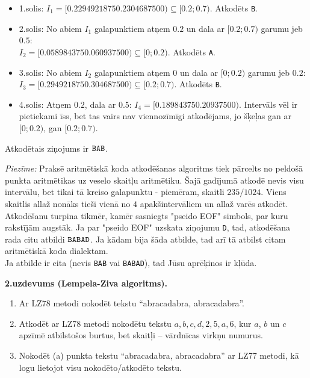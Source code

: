 \documentclass[a4paper,12pt]{article}
\begin{document}
{\begin{itemize}
\item 1.solis: $I_1 = [0.2294921875 0.2304687500) \subseteq [0.2;0.7)$. Atkodēts {\tt B}.
\item 2.solis: No abiem $I_1$ galapunktiem atņem $0.2$ un dala ar $[0.2;0.7)$ garumu jeb $0.5$:\\
$I_2 = [0.058984375 0.060937500) \subseteq [0;0.2)$. Atkodēts {\tt A}.
\item 3.solis: No abiem $I_2$ galapunktiem atņem $0$ un dala ar $[0;0.2)$ garumu jeb $0.2$:\\
$I_3 = [0.294921875 0.304687500) \subseteq [0.2;0.7)$. Atkodēts {\tt B}.
\item 4.solis: Atņem $0.2$, dala ar $0.5$: $I_4 = [0.18984375 0.20937500)$. Intervāls vēl ir pietiekami 
īss, bet tas vairs nav viennozīmīgi atkodējams, jo šķeļas gan ar $[0;0.2)$, gan $[0.2;0.7)$. 
\end{itemize}

Atkodētais ziņojums ir ${\tt BAB}$. 

{\em Piezīme:} Praksē aritmētiskā koda atkodēšanas algoritms tiek pārcelts no peldošā punkta aritmētikas uz veselo skaitļu aritmētiku. 
Šajā gadījumā atkodē nevis visu intervālu, bet tikai tā kreiso galapunktu - piemēram, skaitli $235/1024$. 
Viens skaitlis allaž nonāks tieši vienā no $4$ apakšintervāliem un allaž varēs atkodēt.
Atkodēšanu turpina tikmēr, kamēr sasniegts "pseido EOF" simbols, par kuru rakstījām augstāk. 
Ja par "pseido EOF" uzskata ziņojumu {\tt D}, tad, atkodēšana rada citu atbildi ${\tt BABAD}$. 
Ja kādam bija šāda atbilde, tad arī tā atbilst citam aritmētiskā koda dialektam.\\
Ja atbilde ir cita (nevis {\tt BAB} vai {\tt BABAD}), tad Jūsu aprēķinos ir kļūda.

}







{\bf 2.uzdevums (Lempela-Ziva algoritms).}

\begin{enumerate}
\item 
Ar LZ78 metodi nokodēt tekstu “abracadabra, abracadabra”.
\item Atkodēt ar LZ78 metodi nokodētu tekstu $a,b,c,d,2,5,a,6$, kur
$a$, $b$ un $c$ apzīmē atbilstošos burtus, bet skaitļi – vārdnīcas virkņu
numurus.
\item
Nokodēt (a) punkta tekstu “abracadabra, abracadabra” 
ar LZ77 metodi, kā logu lietojot visu nokodēto/atkodēto tekstu.
\end{enumerate}
\end{document}
